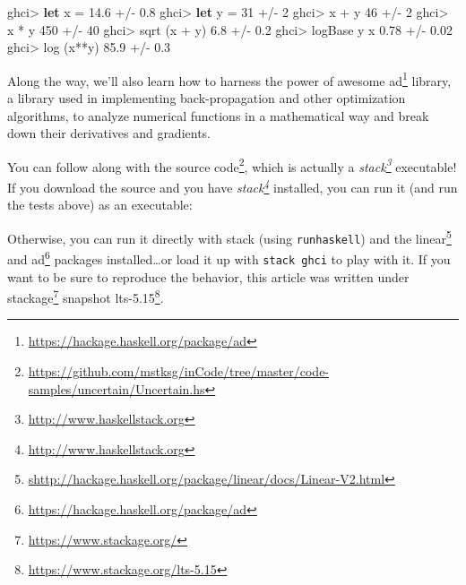 \documentclass[]{article}
\newenvironment{Shaded}{}{}
\newcommand{\KeywordTok}[1]{\textcolor[rgb]{0.00,0.44,0.13}{\textbf{{#1}}}}
\newcommand{\DecValTok}[1]{\textcolor[rgb]{0.25,0.63,0.44}{{#1}}}
\newcommand{\FloatTok}[1]{\textcolor[rgb]{0.25,0.63,0.44}{{#1}}}
\newcommand{\FunctionTok}[1]{\textcolor[rgb]{0.02,0.16,0.49}{{#1}}}
\newcommand{\ExtensionTok}[1]{{#1}}
\newcommand{\NormalTok}[1]{{#1}}
\renewcommand{\href}[2]{#2\footnote{\url{#1}}}
\begin{document}
\begin{Shaded}
\begin{Highlighting}[]
\NormalTok{ghci}\FunctionTok{>} \KeywordTok{let} \NormalTok{x }\FunctionTok{=} \FloatTok{14.6} \FunctionTok{+/-} \FloatTok{0.8}
\NormalTok{ghci}\FunctionTok{>} \KeywordTok{let} \NormalTok{y }\FunctionTok{=} \DecValTok{31}   \FunctionTok{+/-} \DecValTok{2}
\NormalTok{ghci}\FunctionTok{>} \NormalTok{x }\FunctionTok{+} \NormalTok{y}
\DecValTok{46} \FunctionTok{+/-} \DecValTok{2}
\NormalTok{ghci}\FunctionTok{>} \NormalTok{x }\FunctionTok{*} \NormalTok{y}
\DecValTok{450} \FunctionTok{+/-} \DecValTok{40}
\NormalTok{ghci}\FunctionTok{>} \NormalTok{sqrt (x }\FunctionTok{+} \NormalTok{y)}
\FloatTok{6.8} \FunctionTok{+/-} \FloatTok{0.2}
\NormalTok{ghci}\FunctionTok{>} \NormalTok{logBase y x}
\FloatTok{0.78} \FunctionTok{+/-} \FloatTok{0.02}
\NormalTok{ghci}\FunctionTok{>} \NormalTok{log (x}\FunctionTok{**}\NormalTok{y)}
\FloatTok{85.9} \FunctionTok{+/-} \FloatTok{0.3}
\end{Highlighting}
\end{Shaded}

Along the way, we'll also learn how to harness the power of awesome
\href{https://hackage.haskell.org/package/ad}{ad} library, a library used in
implementing back-propagation and other optimization algorithms, to analyze
numerical functions in a mathematical way and break down their derivatives and
gradients.

You can follow along with
\href{https://github.com/mstksg/inCode/tree/master/code-samples/uncertain/Uncertain.hs}{the
source code}, which is actually a
\emph{\href{http://www.haskellstack.org}{stack}} executable! If you download the
source and you have \emph{\href{http://www.haskellstack.org}{stack}} installed,
you can run it (and run the tests above) as an executable:

\begin{Shaded}
\end{Shaded}

Otherwise, you can run it directly with stack (using \texttt{runhaskell}) and
the
\href{shttp://hackage.haskell.org/package/linear/docs/Linear-V2.html}{linear}
and \href{https://hackage.haskell.org/package/ad}{ad} packages
installed\ldots{}or load it up with \texttt{stack\ ghci} to play with it. If you
want to be sure to reproduce the behavior, this article was written under
\href{https://www.stackage.org/}{stackage} snapshot
\href{https://www.stackage.org/lts-5.15}{lts-5.15}.
\end{document}
